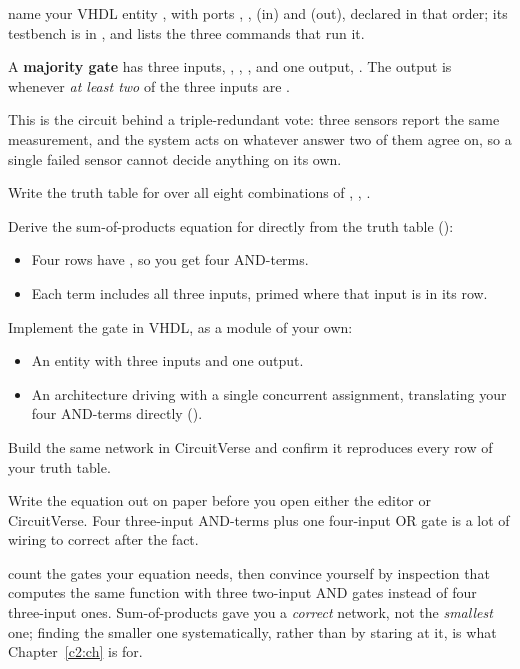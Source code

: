 
\selfcheck name your VHDL entity , with ports , ,  (in) and
 (out), declared in that order; its testbench is in , and
 lists the three commands that run it.

\label{c1:ex:4}
A \textbf{majority gate} has three inputs, , , , and one output, .
The output is  whenever \emph{at least two} of the three inputs are .

This is the circuit behind a triple-redundant vote: three sensors report the same measurement, and
the system acts on whatever answer two of them agree on, so a single failed sensor cannot decide
anything on its own.

\begin{parts}
  \item Write the truth table for  over all eight combinations of , ,
    .
  \item Derive the sum-of-products equation for  directly from the truth table
    ():
    \begin{itemize}
      \item Four rows have , so you get four AND-terms.
      \item Each term includes all three inputs, primed where that input is  in its row.
    \end{itemize}
  \item Implement the gate in VHDL, as a module of your own:
    \begin{itemize}
      \item An entity with three  inputs and one  output.
      \item An architecture driving  with a single concurrent assignment, translating your
        four AND-terms directly ().
    \end{itemize}
  \item Build the same network in CircuitVerse and confirm it reproduces every row of your truth
    table.
\end{parts}
\note[Tip] Write the equation out on paper before you open either the editor or CircuitVerse. Four
three-input AND-terms plus one four-input OR gate is a lot of wiring to correct after the fact.

 count the gates your equation needs, then convince yourself by inspection that
 computes the same function with three two-input AND gates instead of four
three-input ones. Sum-of-products gave you a \emph{correct} network, not the \emph{smallest} one;
finding the smaller one systematically, rather than by staring at it, is what Chapter~\ref{c2:ch}
is for.

